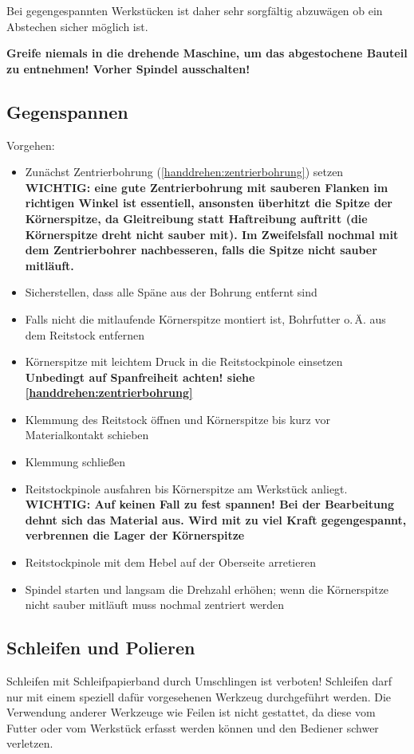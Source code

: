 \documentclass{\basedir/fablab-document}
\begin{document}
Bei gegengespannten Werkstücken ist daher sehr sorgfältig abzuwägen ob ein Abstechen sicher möglich ist. 

\textbf{Greife niemals in die drehende Maschine, um das abgestochene Bauteil zu entnehmen! Vorher Spindel ausschalten!}


\subsection{Gegenspannen}
\label{handdrehen:gegenspannen}

Vorgehen:
\begin{itemize}
\item Zunächst Zentrierbohrung (\ref{handdrehen:zentrierbohrung}) setzen\\
	\textbf{WICHTIG: eine gute Zentrierbohrung mit sauberen Flanken im richtigen Winkel ist essentiell, ansonsten überhitzt die Spitze der Körnerspitze, da Gleitreibung statt Haftreibung auftritt (die Körnerspitze dreht nicht sauber mit). Im Zweifelsfall nochmal mit dem Zentrierbohrer nachbesseren, falls die Spitze nicht sauber mitläuft.} 
\item Sicherstellen, dass alle Späne aus der Bohrung entfernt sind
\item Falls nicht die mitlaufende Körnerspitze montiert ist, Bohrfutter o.\,Ä. aus dem Reitstock entfernen
\item Körnerspitze mit leichtem Druck in die Reitstockpinole einsetzen\\
\textbf{Unbedingt auf Spanfreiheit achten! siehe \ref{handdrehen:zentrierbohrung}}
\item Klemmung des Reitstock öffnen und Körnerspitze bis kurz vor Materialkontakt schieben 
\item Klemmung schließen
\item Reitstockpinole ausfahren bis Körnerspitze am Werkstück anliegt.\\
\textbf{WICHTIG: Auf keinen Fall zu fest spannen! Bei der Bearbeitung dehnt sich das Material aus. Wird mit zu viel Kraft gegengespannt, verbrennen die Lager der Körnerspitze}
\item Reitstockpinole mit dem Hebel auf der Oberseite arretieren
\item Spindel starten und langsam die Drehzahl erhöhen; wenn die Körnerspitze nicht sauber mitläuft muss nochmal zentriert werden
\end{itemize}

\subsection{Schleifen und Polieren}
Schleifen mit Schleifpapierband durch Umschlingen ist verboten!
Schleifen darf nur mit einem speziell dafür vorgesehenen Werkzeug durchgeführt werden. Die Verwendung anderer Werkzeuge wie Feilen ist nicht gestattet, da diese vom Futter oder vom Werkstück erfasst werden können und den Bediener schwer verletzen.
\end{document}
